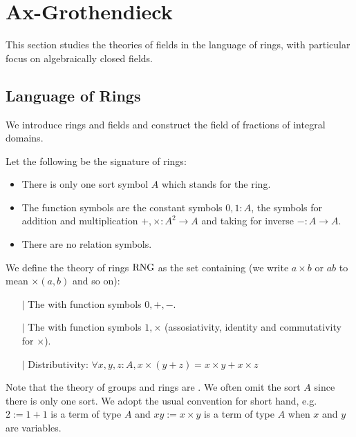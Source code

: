 \section{Ax-Grothendieck}
This section studies the theories of fields in the language of rings,
with particular focus on algebraically closed fields.

\subsection{Language of Rings}
We introduce rings and fields and construct the field of fractions
of integral domains.

\begin{dfn}
    Let the following be the signature of rings:
    \begin{itemize}
        \item There is only one sort symbol $A$ which stands for the ring.
        \item The function symbols are the constant symbols $0, 1 : A$, 
        the symbols for addition and multiplication $+ , \times : A^2 \to A$ 
        and taking for inverse $- : A \to A$.
        \item There are no relation symbols.
    \end{itemize}

    We define the theory of rings $\mathrm{RNG}$ as the set containing
    (we write $a \times b$ or $a b$ to mean $\times(a,b)$ and so on):
    \begin{itemize}
        \item[$\vert$] The 
        with function symbols $0, +, -$.
        \item[$\vert$] The 
        with function symbols $1, \times$ 
        (assosiativity, identity and commutativity for $\times$).
        \item[$\vert$] Distributivity:
        $\forall x, y, z : A, x \times (y + z) = x \times y + x \times z$
    \end{itemize}
    Note that the theory of groups and rings are 
    .
    We often omit the sort $A$ since there is only one sort.
    We adopt the usual convention for short hand, e.g. $2 := 1 + 1$ is 
    a term of type $A$ and $xy := x \times y$ is a term of type $A$ when 
    $x$ and $y$ are variables.
\end{dfn}

